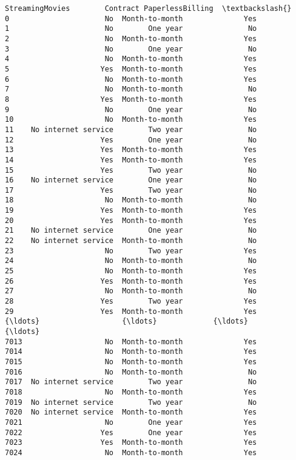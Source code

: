 \documentclass[11pt]{article}
\begin{document}
\begin{tcolorbox}[breakable, boxrule=.5pt, size=fbox, pad at break*=1mm, opacityfill=0]
\begin{Verbatim}[commandchars=\\\{\}]
          StreamingMovies        Contract PaperlessBilling  \textbackslash{}
0                      No  Month-to-month              Yes
1                      No        One year               No
2                      No  Month-to-month              Yes
3                      No        One year               No
4                      No  Month-to-month              Yes
5                     Yes  Month-to-month              Yes
6                      No  Month-to-month              Yes
7                      No  Month-to-month               No
8                     Yes  Month-to-month              Yes
9                      No        One year               No
10                     No  Month-to-month              Yes
11    No internet service        Two year               No
12                    Yes        One year               No
13                    Yes  Month-to-month              Yes
14                    Yes  Month-to-month              Yes
15                    Yes        Two year               No
16    No internet service        One year               No
17                    Yes        Two year               No
18                     No  Month-to-month               No
19                    Yes  Month-to-month              Yes
20                    Yes  Month-to-month              Yes
21    No internet service        One year               No
22    No internet service  Month-to-month               No
23                     No        Two year              Yes
24                     No  Month-to-month               No
25                     No  Month-to-month              Yes
26                    Yes  Month-to-month              Yes
27                     No  Month-to-month               No
28                    Yes        Two year              Yes
29                    Yes  Month-to-month              Yes
{\ldots}                   {\ldots}             {\ldots}              {\ldots}
7013                   No  Month-to-month              Yes
7014                   No  Month-to-month              Yes
7015                   No  Month-to-month              Yes
7016                   No  Month-to-month               No
7017  No internet service        Two year               No
7018                   No  Month-to-month              Yes
7019  No internet service        Two year               No
7020  No internet service  Month-to-month              Yes
7021                   No        One year              Yes
7022                  Yes        One year              Yes
7023                  Yes  Month-to-month              Yes
7024                   No  Month-to-month              Yes

\end{Verbatim}
\end{tcolorbox}
\end{document}
